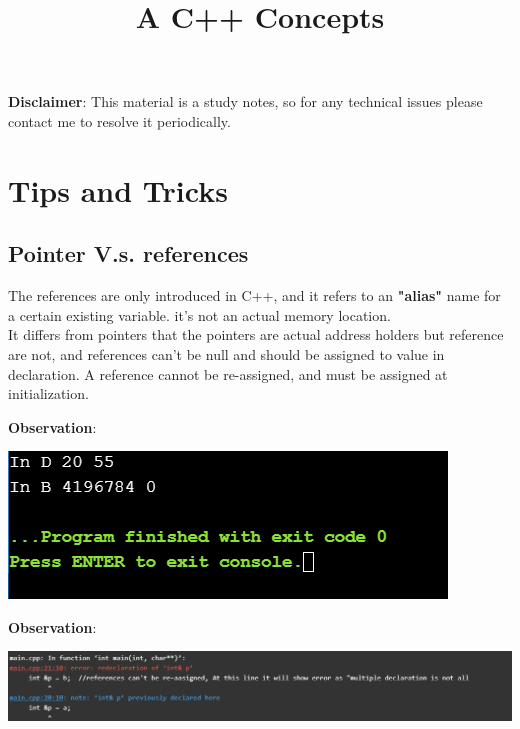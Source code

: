 \documentclass{article}
\title{\textbf{A C++ Concepts}}
\author{}
\date{}
\begin{document}
\textbf{Disclaimer}: This material is a study notes, so for any technical issues please contact me to resolve it periodically.

\begin{minipage}{\textwidth}
    \maketitle
\end{minipage}
\tableofcontents
\lstlistoflistings

\section{Tips and Tricks}
\subsection{Pointer V.s. references}
The references are only introduced in C++, and it refers to an \textbf{"alias"} name for a certain existing variable. it's not an actual memory location.\\
It differs from pointers that the pointers are actual address holders but reference are not, and references can't be null and should be assigned to value in declaration. 
A reference cannot be re-assigned, and must be assigned at initialization.


\textbf{Observation}:\\
\begin{center}
  \includegraphics[scale=0.75]{./cpp_code/basic/sliceoff.PNG}
\end{center}

\textbf{Observation}:\\
\begin{center}
  \includegraphics[scale=0.75]{./cpp_code/basic/refsvspointers.PNG}
\end{center}
\end{document}
